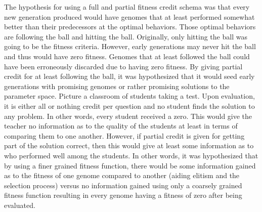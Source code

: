 The hypothesis for using a full and partial fitness credit schema was that every new generation produced would have genomes that at least performed somewhat better than their predecessors at the optimal behaviors. Those optimal behaviors are following the ball and hitting the ball. Originally, only hitting the ball was going to be the fitness criteria. However, early generations may never hit the ball and thus would have zero fitness. Genomes that at least followed the ball could have been erroneously discarded due to having zero fitness. By giving partial credit for at least following the ball, it was hypothesized that it would seed early generations with promising genomes or rather promising solutions to the parameter space. Picture a classroom of students taking a test. Upon evaluation, it is either all or nothing credit per question and no student finds the solution to any problem. In other words, every student received a zero. This would give the teacher no information as to the quality of the students at least in terms of comparing them to one another. However, if partial credit is given for getting part of the solution correct, then this would give at least some information as to who performed well among the students. In other words, it was hypothesized that by using a finer grained fitness function, there would be some information gained as to the fitness of one genome compared to another (aiding elitism and the selection process) versus no information gained using only a coarsely grained fitness function resulting in every genome having a fitness of zero after being evaluated.

